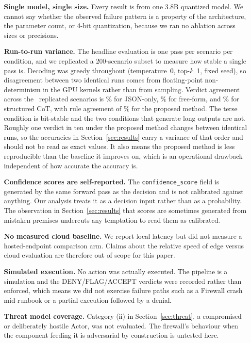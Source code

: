 \documentclass[journal,onecolumn,12pt]{IEEEtran}
\begin{document}
\textbf{Single model, single size.} Every result is from one 3.8B quantized model. We cannot say whether the observed failure pattern is a property of the architecture, the parameter count, or 4-bit quantization, because we ran no ablation across sizes or precisions.

\textbf{Run-to-run variance.} The headline evaluation is one pass per scenario per condition, and we replicated a 200-scenario subset to measure how stable a single pass is. Decoding was greedy throughout (temperature~0, top-$k$~1, fixed seed), so disagreement between two identical runs comes from floating-point non-determinism in the GPU kernels rather than from sampling. Verdict agreement across the \ReplN\ replicated scenarios is \ReplZero\% for JSON-only, \ReplNaive\% for free-form, and \ReplCot\% for structured CoT, with rule agreement of \ReplRuleCot\% for the proposed method. The terse condition is bit-stable and the two conditions that generate long outputs are not. Roughly one verdict in ten under the proposed method changes between identical runs, so the accuracies in Section~\ref{sec:results} carry a variance of that order and should not be read as exact values. It also means the proposed method is less reproducible than the baseline it improves on, which is an operational drawback independent of how accurate the accuracy is.

\textbf{Confidence scores are self-reported.} The \texttt{confidence\_score} field is generated by the same forward pass as the decision and is not calibrated against anything. Our analysis treats it as a decision input rather than as a probability. The observation in Section~\ref{sec:results} that scores are sometimes generated from mistaken premises undercuts any temptation to read them as calibrated.

\textbf{No measured cloud baseline.} We report local latency but did not measure a hosted-endpoint comparison arm. Claims about the relative speed of edge versus cloud evaluation are therefore out of scope for this paper.

\textbf{Simulated execution.} No action was actually executed. The pipeline is a simulation and the DENY/FLAG/ACCEPT verdicts were recorded rather than enforced, which means we did not exercise failure paths such as a Firewall crash mid-runbook or a partial execution followed by a denial.

\textbf{Threat model coverage.} Category (ii) in Section~\ref{sec:threat}, a compromised or deliberately hostile Actor, was not evaluated. The firewall's behaviour when the component feeding it is adversarial by construction is untested here.
\end{document}
